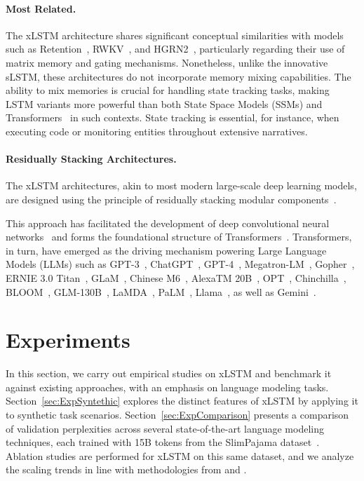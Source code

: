 \paragraph{Most Related.} The xLSTM architecture shares significant conceptual similarities with models such as Retention~\citep{Sun:23arxiv}, RWKV~\citep{Peng:23arxivshort,Peng:24arxivshort}, and HGRN2~\citep{Qin:24arxiv}, particularly regarding their use of matrix memory and gating mechanisms. Nonetheless, unlike the innovative sLSTM, these architectures do not incorporate memory mixing capabilities. The ability to mix memories is crucial for handling state tracking tasks, making LSTM variants more powerful than both State Space Models (SSMs) and Transformers~\citep{Merrill:24,Deletang:23} in such contexts. State tracking is essential, for instance, when executing code or monitoring entities throughout extensive narratives.

\paragraph{Residually Stacking Architectures.} The xLSTM architectures, akin to most modern large-scale deep learning models, are designed using the principle of residually stacking modular components~\citep{Srivastava:15,He:16}.

This approach has facilitated the development of deep convolutional neural networks~\citep{He:16} and forms the foundational structure of Transformers~\citep{Vaswani:17}. Transformers, in turn, have emerged as the driving mechanism powering Large Language Models (LLMs) such as GPT-3~\citep{Brown:20short}, ChatGPT~\citep{Schulman:22short}, GPT-4~\citep{Achiam:23gpt4short}, Megatron-LM~\citep{Shoeybi:19}, Gopher~\citep{Rae:21short}, ERNIE 3.0 Titan~\citep{Wang:21arxivshort}, GLaM~\citep{Du:21glamshort}, Chinese M6~\citep{Lin:21}, AlexaTM 20B~\citep{Soltan:22}, OPT~\citep{Zhang:22opt}, Chinchilla~\citep{Hoffmann:22short}, BLOOM~\citep{Scao:22arxivshort}, GLM-130B~\citep{Zeng:22arxivshort}, LaMDA~\citep{Thoppilan:22short}, PaLM~\citep{Chowdhery:22short}, Llama~\citep{Touvron:23arxiv}, as well as Gemini~\citep{GeminiTeam:23arxiv,Reid:24arxiv}.

\section{Experiments}
\label{sec:Exp}

In this section, we carry out empirical studies on xLSTM and benchmark it against existing approaches, with an emphasis on language modeling tasks. Section~\ref{sec:ExpSyntethic} explores the distinct features of xLSTM by applying it to synthetic task scenarios. Section~\ref{sec:ExpComparison} presents a comparison of validation perplexities across several state-of-the-art language modeling techniques, each trained with 15B tokens from the SlimPajama dataset~\citep{Soboleva:23}. Ablation studies are performed for xLSTM on this same dataset, and we analyze the scaling trends in line with methodologies from \citet{Kaplan:20} and \citet{Brown:20short}.

